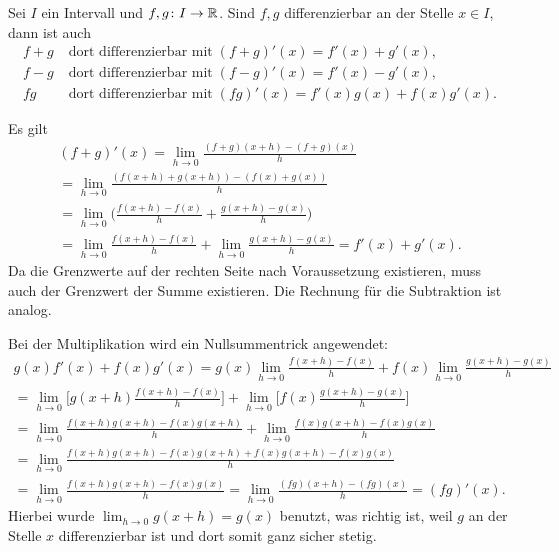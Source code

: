 \begin{Satz}
Sei $I$ ein Intervall und $f,g\colon I\to\mathbb R$. Sind $f,g$
differenzierbar an der Stelle $x\in I$, dann ist auch%
\begin{align}
f+g&\;\text{dort differenzierbar mit}\;(f+g)'(x)=f'(x)+g'(x),\\
f-g&\;\text{dort differenzierbar mit}\;(f-g)'(x)=f'(x)-g'(x),\\
\label{eq:diff-mul}
fg&\;\text{dort differenzierbar mit}\;(fg)'(x)=f'(x)g(x)+f(x)g'(x).
\end{align}
\end{Satz}

\begin{Beweis} Es gilt
\begin{gather}
(f+g)'(x)
= \lim_{h\to 0}\frac{(f+g)(x+h)-(f+g)(x)}{h}\\
= \lim_{h\to 0}\frac{(f(x+h)+g(x+h))-(f(x)+g(x))}{h}\\
= \lim_{h\to 0}\bigg(\frac{f(x+h)-f(x)}{h}+\frac{g(x+h)-g(x)}{h}\bigg)\\
= \lim_{h\to 0}\frac{f(x+h)-f(x)}{h}+\lim_{h\to 0}\frac{g(x+h)-g(x)}{h}
= f'(x)+g'(x).
\end{gather}
Da die Grenzwerte auf der rechten Seite nach Voraussetzung existieren,
muss auch der Grenzwert der Summe existieren.
Die Rechnung für die Subtraktion ist analog.

Bei der Multiplikation wird ein Nullsummentrick angewendet:
\begin{gather}
g(x)f'(x)+f(x)g'(x)
= g(x)\lim_{h\to 0}\frac{f(x+h)-f(x)}{h}
+ f(x)\lim_{h\to 0}\frac{g(x+h)-g(x)}{h}\\
= \lim_{h\to 0}\bigg[g(x+h)\frac{f(x+h)-f(x)}{h}\bigg]
+ \lim_{h\to 0}\bigg[f(x)\frac{g(x+h)-g(x)}{h}\bigg]\\
= \lim_{h\to 0}\frac{f(x+h)g(x+h)-f(x)g(x+h)}{h}
+ \lim_{h\to 0}\frac{f(x)g(x+h)-f(x)g(x)}{h}\\
= \lim_{h\to 0}\frac{f(x+h)g(x+h)-f(x)g(x+h)+f(x)g(x+h)-f(x)g(x)}{h}\\
= \lim_{h\to 0}\frac{f(x+h)g(x+h)-f(x)g(x)}{h}
= \lim_{h\to 0}\frac{(fg)(x+h)-(fg)(x)}{h}
= (fg)'(x).
\end{gather}
Hierbei wurde $\lim_{h\to 0}g(x+h)=g(x)$ benutzt, was richtig ist,
weil $g$ an der Stelle $x$ differenzierbar ist und dort somit ganz
sicher stetig.\;\qedsymbol
\end{Beweis}

